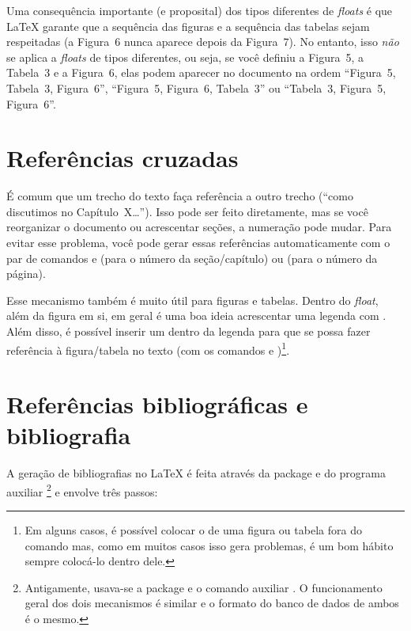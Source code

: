 Uma consequência importante (e proposital) dos tipos diferentes de
\emph{floats} é que \LaTeX{} garante que a sequência
das figuras e a sequência das tabelas sejam respeitadas (a Figura~6 nunca
aparece depois da Figura~7). No entanto, isso \emph{não} se aplica a
\emph{floats} de tipos diferentes, ou seja, se você definiu a Figura~5,
a Tabela~3 e a Figura~6, elas podem aparecer no documento na ordem
``Figura~5, Tabela~3, Figura~6'', ``Figura~5, Figura~6, Tabela~3'' ou
``Tabela~3, Figura~5, Figura~6''.

\section{Referências cruzadas}
\label{sec:refs}

É comum que um trecho do texto faça referência a outro trecho (``como
discutimos no Capítulo~X\ldots''). Isso pode ser feito diretamente, mas
se você reorganizar o documento ou acrescentar seções, a numeração pode
mudar. Para evitar esse problema, você pode gerar essas referências
automaticamente com o par de comandos  e
 (para o número da seção/capítulo) ou
 (para o número da página).

Esse mecanismo também é muito útil para figuras e tabelas. Dentro do
\emph{float}, além da figura em si, em geral é uma boa ideia acrescentar
uma legenda com . Além disso, é possível
inserir um  dentro da legenda para que se possa fazer
referência à figura/tabela no texto (com os comandos  e
)\footnote{Em alguns casos, é possível colocar o
 de uma figura ou tabela fora do comando 
mas, como em muitos casos isso gera problemas, é um bom hábito sempre
colocá-lo dentro dele.}.


\section{Referências bibliográficas e bibliografia}

\enlargethispage{-.5\baselineskip}

A geração de bibliografias no \LaTeX{} é feita através da package
 e do programa auxiliar
\footnote{Antigamente, usava-se a package
 e o comando auxiliar .
O funcionamento geral dos dois mecanismos é similar e o formato do banco
de dados de ambos é o mesmo.} e envolve três passos:

